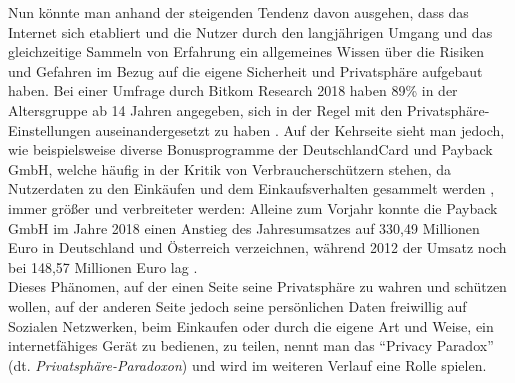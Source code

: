 Nun könnte man anhand der steigenden Tendenz davon ausgehen, dass das Internet sich etabliert und die Nutzer durch den langjährigen Umgang und das gleichzeitige Sammeln von Erfahrung ein allgemeines Wissen über die Risiken und Gefahren im Bezug auf die eigene Sicherheit und Privatsphäre aufgebaut haben. Bei einer Umfrage durch 
Bitkom Research 2018 haben 89\% in der Altersgruppe ab 14 Jahren angegeben, sich in der Regel mit den Privatsphäre-Einstellungen auseinandergesetzt zu haben \cite{Bitkom:2018aa}. Auf der Kehrseite sieht man jedoch, wie beispielsweise diverse Bonusprogramme der DeutschlandCard und Payback GmbH, welche häufig in der Kritik von 
Verbraucherschützern stehen, da Nutzerdaten zu den Einkäufen und dem Einkaufsverhalten gesammelt werden \cite{Hatke:aa}, immer größer und verbreiteter werden: Alleine zum Vorjahr konnte die Payback GmbH im Jahre 2018 einen Anstieg des Jahresumsatzes auf 330,49 Millionen Euro in Deutschland und Österreich verzeichnen, während 2012 der Umsatz noch bei 148,57 Millionen 
Euro lag \cite{Payback:2019aa}. \\ Dieses Phänomen, auf der einen Seite seine Privatsphäre zu wahren und schützen wollen, auf der anderen Seite jedoch seine persönlichen Daten freiwillig auf Sozialen Netzwerken, beim Einkaufen oder durch die eigene Art und Weise, ein internetfähiges Gerät zu bedienen, zu teilen, nennt man das \enquote{Privacy Paradox} (dt. 
\textit{Privatsphäre-Paradoxon}) \cite{Barnes:2006aa} und wird im weiteren Verlauf eine Rolle spielen.
